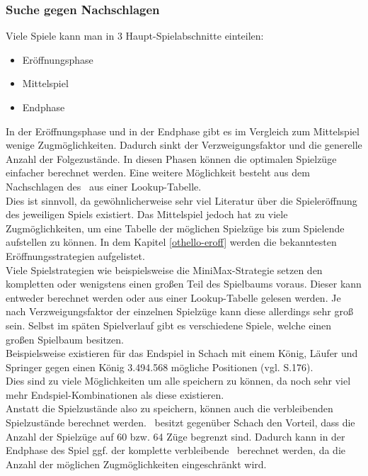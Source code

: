 \subsubsection{Suche gegen Nachschlagen}
Viele Spiele kann man in 3 Haupt-Spielabschnitte einteilen:
\begin{itemize}
\item Eröffnungsphase
\item Mittelspiel
\item Endphase
\end{itemize}
In der Eröffnungsphase und in der Endphase gibt es im Vergleich zum Mittelspiel wenige Zugmöglichkeiten. Dadurch sinkt der Verzweigungsfaktor und die generelle Anzahl der Folgezustände. In diesen Phasen können die optimalen Spielzüge einfacher berechnet werden. Eine weitere Möglichkeit besteht aus dem Nachschlagen des \states\ aus einer Lookup-Tabelle.
\\Dies ist sinnvoll, da gewöhnlicherweise sehr viel Literatur über die Spieleröffnung des jeweiligen Spiels existiert.%
Das Mittelspiel jedoch hat zu viele Zugmöglichkeiten, um eine Tabelle der möglichen Spielzüge bis zum Spielende aufstellen zu können. In dem Kapitel \ref{othello-eroff} werden die bekanntesten Eröffnungsstrategien aufgelistet.
\\Viele Spielstrategien wie beispielsweise die MiniMax-Strategie setzen den kompletten oder wenigstens einen großen Teil des Spielbaums voraus. Dieser kann entweder berechnet werden oder aus einer Lookup-Tabelle gelesen werden. Je nach Verzweigungsfaktor der einzelnen Spielzüge kann diese allerdings sehr groß sein. Selbst im späten Spielverlauf gibt es verschiedene Spiele, welche einen großen Spielbaum besitzen.
\\Beispielsweise existieren für das Endspiel in Schach mit einem König, Läufer und Springer gegen einen König 3.494.568 mögliche Positionen (vgl. \cite{Russell.2016} S.176).
\\Dies sind zu viele Möglichkeiten um alle speichern zu können, da noch sehr viel mehr Endspiel-Kombinationen als diese existieren.
\\Anstatt die Spielzustände also zu speichern, können auch die verbleibenden Spielzustände berechnet werden. \ot\ besitzt gegenüber Schach den Vorteil, dass die Anzahl der Spielzüge auf 60 bzw. 64 Züge begrenzt sind. Dadurch kann in der Endphase des Spiel ggf. der komplette verbleibende \gtree\ berechnet werden, da die Anzahl der möglichen Zugmöglichkeiten eingeschränkt wird.
